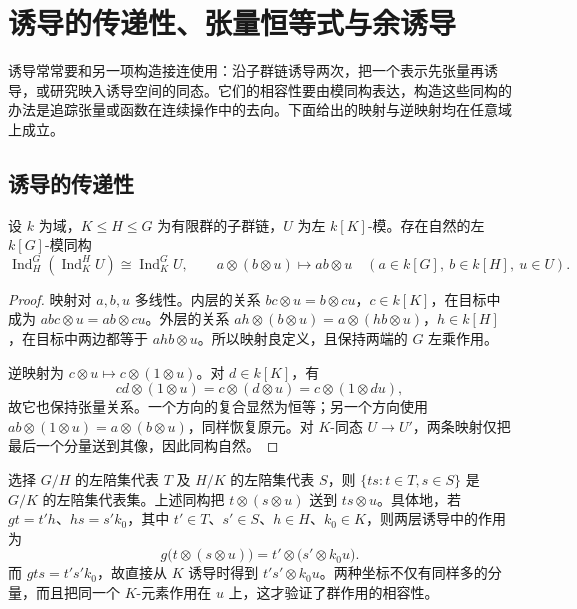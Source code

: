 

\section{诱导的传递性、张量恒等式与余诱导}
\label{b5:sec:0304}

诱导常常要和另一项构造接连使用：沿子群链诱导两次，把一个表示先张量再诱导，或研究映入诱导空间的同态。它们的相容性要由模同构表达，构造这些同构的办法是追踪张量或函数在连续操作中的去向。下面给出的映射与逆映射均在任意域上成立。

\subsection{诱导的传递性}
\label{b5:subsec:0304:01}

\begin{theorem}[诱导的传递性]\label{b5:thm:induction-transitivity}
	设 \(k\) 为域，\(K\le H\le G\) 为有限群的子群链，\(U\) 为左 \(k[K]\)-模。存在自然的左 \(k[G]\)-模同构
	\[
		\operatorname{Ind}_H^G\left(\operatorname{Ind}_K^H U\right) \cong \operatorname{Ind}_K^G U, \qquad a\otimes(b\otimes u)\longmapsto ab\otimes u \quad(a\in k[G],\ b\in k[H],\ u\in U).
	\]
\end{theorem}
\begin{proof}
	映射对 \(a,b,u\) 多线性。内层的关系 \(bc\otimes u=b\otimes cu\)，\(c\in k[K]\)，在目标中成为 \(abc\otimes u=ab\otimes cu\)。外层的关系 \(ah\otimes(b\otimes u)=a\otimes(hb\otimes u)\)，\(h\in k[H]\)，在目标中两边都等于 \(ahb\otimes u\)。所以映射良定义，且保持两端的 \(G\) 左乘作用。

	逆映射为 \(c\otimes u\mapsto c\otimes(1\otimes u)\)。对 \(d\in k[K]\)，有
	\[
		cd\otimes(1\otimes u) =c\otimes(d\otimes u) =c\otimes(1\otimes du),
	\]
	故它也保持张量关系。一个方向的复合显然为恒等；另一个方向使用 \(ab\otimes(1\otimes u)=a\otimes(b\otimes u)\)，同样恢复原元。对 \(K\)-同态 \(U\rightarrow U'\)，两条映射仅把最后一个分量送到其像，因此同构自然。
\end{proof}

选择 \(G/H\) 的左陪集代表 \(T\) 及 \(H/K\) 的左陪集代表 \(S\)，则 \(\{ts:t\in T,s\in S\}\) 是 \(G/K\) 的左陪集代表集。上述同构把 \(t\otimes(s\otimes u)\) 送到 \(ts\otimes u\)。具体地，若 \(gt=t'h\)、\(hs=s'k_0\)，其中 \(t'\in T\)、\(s'\in S\)、\(h\in H\)、\(k_0\in K\)，则两层诱导中的作用为
\[
	g\bigl(t\otimes(s\otimes u)\bigr) =t'\otimes\bigl(s'\otimes k_0u\bigr).
\]
而 \(gts=t's'k_0\)，故直接从 \(K\) 诱导时得到 \(t's'\otimes k_0u\)。两种坐标不仅有同样多的分量，而且把同一个 \(K\)-元素作用在 \(u\) 上，这才验证了群作用的相容性。

